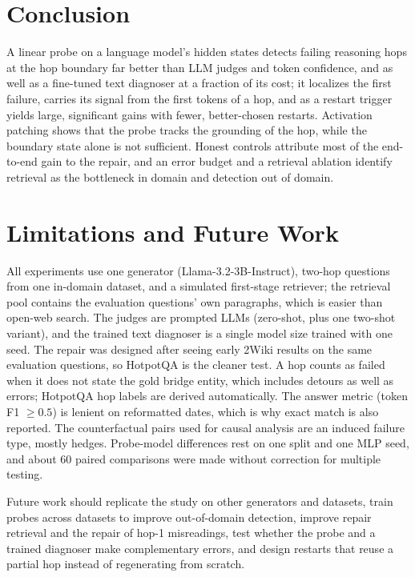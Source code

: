 \documentclass[11pt]{article}
\begin{document}
\section{Conclusion}

A linear probe on a language model's hidden states detects failing reasoning hops at the hop boundary far better than LLM judges and token confidence, and as well as a fine-tuned text diagnoser at a fraction of its cost; it localizes the first failure, carries its signal from the first tokens of a hop, and as a restart trigger yields large, significant gains with fewer, better-chosen restarts. Activation patching shows that the probe tracks the grounding of the hop, while the boundary state alone is not sufficient. Honest controls attribute most of the end-to-end gain to the repair, and an error budget and a retrieval ablation identify retrieval as the bottleneck in domain and detection out of domain.

\section*{Limitations and Future Work}

All experiments use one generator (Llama-3.2-3B-Instruct), two-hop questions from one in-domain dataset, and a simulated first-stage retriever; the retrieval pool contains the evaluation questions' own paragraphs, which is easier than open-web search. The judges are prompted LLMs (zero-shot, plus one two-shot variant), and the trained text diagnoser is a single model size trained with one seed. The repair was designed after seeing early 2Wiki results on the same evaluation questions, so HotpotQA is the cleaner test. A hop counts as failed when it does not state the gold bridge entity, which includes detours as well as errors; HotpotQA hop labels are derived automatically. The answer metric (token F1 $\geq 0.5$) is lenient on reformatted dates, which is why exact match is also reported. The counterfactual pairs used for causal analysis are an induced failure type, mostly hedges. Probe-model differences rest on one split and one MLP seed, and about 60 paired comparisons were made without correction for multiple testing.

Future work should replicate the study on other generators and datasets, train probes across datasets to improve out-of-domain detection, improve repair retrieval and the repair of hop-1 misreadings, test whether the probe and a trained diagnoser make complementary errors, and design restarts that reuse a partial hop instead of regenerating from scratch.
\end{document}
